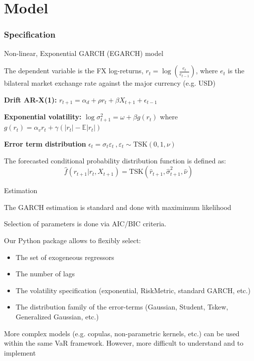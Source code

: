 \documentclass{beamer}
\newenvironment{largeitemize}{\itemize\addtolength{\itemsep}{10pt}}{\enditemize}
\begin{document}
\section{Model}

\begin{frame}
  \frametitle{Specification}
\begin{largeitemize}  
\item Non-linear, Exponential GARCH (EGARCH) model 
\item The dependent variable is the FX log-returns, $r_t = \log(\frac{e_t}{e_{t-1}})$, where
$e_t$ is the bilateral market exchange rate against the major currency
(e.g. USD)
\item \textbf{Drift AR-X(1):} $r_{t+1} = \alpha_d +
  \rho r_t + \beta X_{t+1} + \epsilon_{t-1}$\\  
\item \textbf{Exponential volatility:} $\log \sigma_{t+1}^{2} = \omega + \beta
g(r_t)$ where $g(r_t) = \alpha_v r_t + \gamma(|r_t|-\mathbb{E}|r_t|)$

\item \textbf{Error term distribution} $\epsilon_t = \sigma_t \varepsilon_t
  \ , \varepsilon_t \sim \text{TSK}(0, 1,\nu)$\\
  
\item The forecasted conditional probability distribution function is defined as:
      \begin{equation*}
        \hat{f}(r_{t+1} | r_{t}, X_{t+1}) = \text{TSK}(\hat{r}_{t+1},
        \hat{\sigma}_{t+1}^{2}, \hat{\nu})
      \end{equation*}      
\end{largeitemize}
\end{frame}

\begin{frame}{Estimation}
\begin{largeitemize}
\item The GARCH estimation is standard and done with maximimum likelihood
 \item Selection of parameters is done via AIC/BIC criteria.    
  \item Our Python package allows to flexibly select:
    \begin{itemize}
    \item The set of exogeneous regressors
    \item The number of lags
    \item The volatility specification (exponential, RiskMetric, standard GARCH,
      etc.)
    \item The distribution family of the error-terms (Gaussian,
    Student, Tskew, Generalized Gaussian, etc.)  
  \end{itemize}
\item More complex models (e.g. copulas, non-parametric kernels, etc.) can be
  used within the same VaR framework. However, more difficult to understand
  and to implement
\end{largeitemize}
\end{frame}
\end{document}
